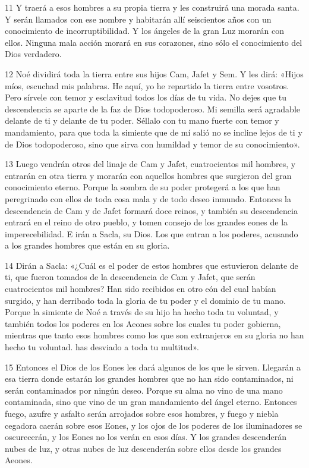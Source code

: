 \par 11 Y traerá a esos hombres a su propia tierra y les construirá una morada santa. Y serán llamados con ese nombre y habitarán allí seiscientos años con un conocimiento de incorruptibilidad. Y los ángeles de la gran Luz morarán con ellos. Ninguna mala acción morará en sus corazones, sino sólo el conocimiento del Dios verdadero.

\par 12 Noé dividirá toda la tierra entre sus hijos Cam, Jafet y Sem. Y les dirá: «Hijos míos, escuchad mis palabras. He aquí, yo he repartido la tierra entre vosotros. Pero sírvele con temor y esclavitud todos los días de tu vida. No dejes que tu descendencia se aparte de la faz de Dios todopoderoso. Mi semilla será agradable delante de ti y delante de tu poder. Séllalo con tu mano fuerte con temor y mandamiento, para que toda la simiente que de mí salió no se incline lejos de ti y de Dios todopoderoso, sino que sirva con humildad y temor de su conocimiento».

\par 13 Luego vendrán otros del linaje de Cam y Jafet, cuatrocientos mil hombres, y entrarán en otra tierra y morarán con aquellos hombres que surgieron del gran conocimiento eterno. Porque la sombra de su poder protegerá a los que han peregrinado con ellos de toda cosa mala y de todo deseo inmundo. Entonces la descendencia de Cam y de Jafet formará doce reinos, y también su descendencia entrará en el reino de otro pueblo, y tomen consejo de los grandes eones de la imperecebilidad. E irán a Sacla, su Dios. Los que entran a los poderes, acusando a los grandes hombres que están en su gloria.

\par 14 Dirán a Sacla: «¿Cuál es el poder de estos hombres que estuvieron delante de ti, que fueron tomados de la descendencia de Cam y Jafet, que serán cuatrocientos mil hombres? Han sido recibidos en otro eón del cual habían surgido, y han derribado toda la gloria de tu poder y el dominio de tu mano. Porque la simiente de Noé a través de su hijo ha hecho toda tu voluntad, y también todos los poderes en los Aeones sobre los cuales tu poder gobierna, mientras que tanto esos hombres como los que son extranjeros en su gloria no han hecho tu voluntad. has desviado a toda tu multitud».

\par 15 Entonces el Dios de los Eones les dará algunos de los que le sirven. Llegarán a esa tierra donde estarán los grandes hombres que no han sido contaminados, ni serán contaminados por ningún deseo. Porque su alma no vino de una mano contaminada, sino que vino de un gran mandamiento del ángel eterno. Entonces fuego, azufre y asfalto serán arrojados sobre esos hombres, y fuego y niebla cegadora caerán sobre esos Eones, y los ojos de los poderes de los iluminadores se oscurecerán, y los Eones no los verán en esos días. Y los grandes descenderán nubes de luz, y otras nubes de luz descenderán sobre ellos desde los grandes Aeones.

